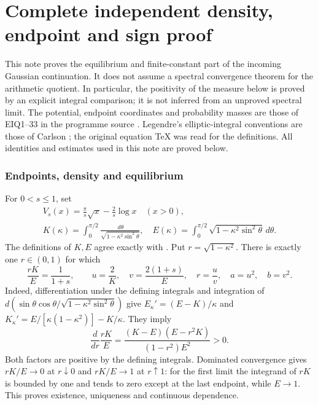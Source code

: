 \endgroup

\clearpage\begingroup
\part*{Complete independent density, endpoint and sign proof}
\newtheorem{garmomenttheorem}{Theorem}\newtheorem{garmomentlemma}[garmomenttheorem]{Lemma}
\newcommand{\garmomentdd}{\,d}\newcommand{\garmomentR}{\mathbb R}

This note proves the equilibrium and finite-constant part of the incoming
Gaussian continuation. It does not assume a spectral convergence theorem
for the arithmetic quotient. In particular, the positivity of the measure
below is proved by an explicit integral comparison; it is not inferred
from an unproved spectral limit. The potential, endpoint coordinates and
probability masses are those of EIQ1--33 in the programme source
\cite{garmoment:EIQ}. Legendre's elliptic-integral conventions are those of Carlson
\cite{garmoment:Carlson}; the original equation TeX was read for the definitions.
All identities and estimates used in this note are proved below.

\section{Endpoints, density and equilibrium}
For $0<s\le1$, set
\begin{equation}\tag{GM1}
 \begin{gathered}
 V_s(x)=\frac\pi s\sqrt x-\frac2s\log x\quad(x>0),\qquad
 \\
 K(\kappa)=\int_0^{\pi/2}\frac{\garmomentdd\theta}{\sqrt{1-\kappa^2\sin^2\theta}},
 \quad E(\kappa)=\int_0^{\pi/2}\sqrt{1-\kappa^2\sin^2\theta}\garmomentdd\theta.
 \end{gathered}
\end{equation}
The definitions of $K,E$ agree exactly with \cite[19.2.4, 19.2.5,
19.2.8(a,b)]{garmoment:Carlson}. Put $r=\sqrt{1-\kappa^2}$. There is exactly one
$r\in(0,1)$ for which
\begin{equation}\tag{GM2}
 \frac{rK}{E}=\frac1{1+s},\qquad
 u=\frac2K,\quad v=\frac{2(1+s)}E,\quad r=\frac uv,
 \quad a=u^2,\quad b=v^2.
\end{equation}
Indeed, differentiation under the defining integrals and integration of
$d(\sin\theta\cos\theta/\sqrt{1-\kappa^2\sin^2\theta})$ give
$E_\kappa'=(E-K)/\kappa$ and
$K_\kappa'=E/[\kappa(1-\kappa^2)]-K/\kappa$.
They imply
\begin{equation}\tag{GM3}
 \frac{d}{dr}\frac{rK}E
 =\frac{(K-E)(E-r^2K)}{(1-r^2)E^2}>0.
\end{equation}
Both factors are positive by the defining integrals. Dominated convergence
gives $rK/E\to0$ at $r\downarrow0$ and $rK/E\to1$ at $r\uparrow1$:
for the first limit the integrand of $rK$ is bounded by one and tends
to zero except at the last endpoint, while $E\to1$.
This proves existence, uniqueness and continuous dependence.

